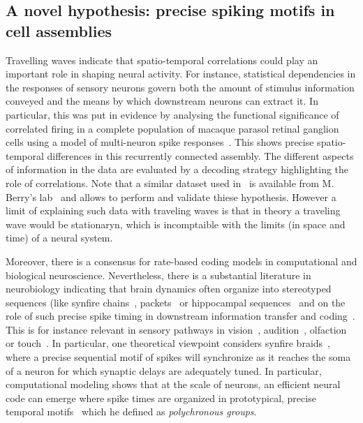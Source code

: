 \documentclass[brainsci, %
               review,submit,pdftex,moreauthors%
               ]{Definitions/mdpi}
\begin{document}
\subsection{A novel hypothesis: precise spiking motifs in cell assemblies}
Travelling waves indicate that spatio-temporal correlations could play an important role in shaping neural activity. For instance, statistical dependencies in the responses of sensory neurons govern both the amount of stimulus information conveyed and the means by which downstream neurons can extract it. In particular, this was put in evidence by analysing the functional significance of correlated firing in a complete population of macaque parasol retinal ganglion cells using a model of multi-neuron spike responses~\citep{pillow_spatio-temporal_2008}. This shows precise spatio-temporal differences in this recurrently connected assembly. The different aspects of information in the data are evaluated by a decoding strategy highlighting the role of correlations. Note that a similar dataset used in~\citep{schneidman_weak_2006} is available from M. Berry's lab~\citep{berry_spike_2022} and allows to perform and validate thiese hypothesis. However a limit of explaining such data with traveling waves is that in theory a traveling wave would be stationaryn, which is incomptaible with the limits (in space and time) of a neural system. 

Moreover, there is a consensus for rate-based coding models in computational and biological neuroscience. Nevertheless, there is a substantial literature in neurobiology indicating that brain dynamics often organize into stereotyped sequences (like synfire chains~\citep{ikegaya_synfire_2004}, packets~\citep{luczak_sequential_2007} or hippocampal sequences~\citep{pastalkova_internally_2008,villette_internally_2015} and on the role of such precise spike timing in downstream information transfer and coding~\citep{villette_internally_2015,branco_dendritic_2010,luczak_packet-based_2015}. This is for instance relevant in sensory pathways in vision~\citep{meister_concerted_1995}, audition~\citep{decharms_primary_1996}, olfaction~\citep{wehr_odour_1996} or touch~\citep{johansson_first_2004}. In particular, one theoretical viewpoint considers synfire braids~\citep{bienenstock_model_1995}, where a precise sequential motif of spikes will synchronize as it reaches the soma of a neuron for which synaptic delays are adequately tuned. In particular, computational modeling shows that at the scale of neurons, an efficient neural code can emerge where spike times are organized in prototypical, precise temporal motifs~\citep{izhikevich_polychronization_2006} which he defined as \emph{polychronous groups}.
\end{document}
